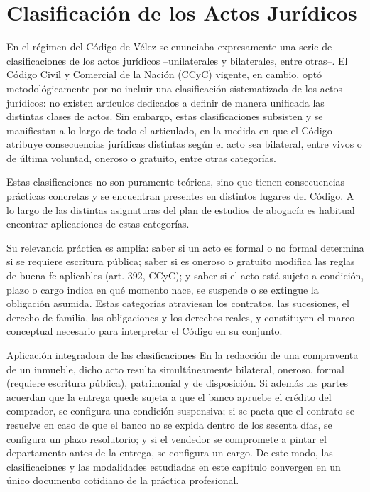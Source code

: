 \documentclass[12pt,oneside]{book}
\begin{document}

\chapter{Clasificación de los Actos Jurídicos}

En el régimen del Código de Vélez se enunciaba expresamente una serie de clasificaciones de los actos jurídicos --unilaterales y bilaterales, entre otras--. El Código Civil y Comercial de la Nación (CCyC) vigente, en cambio, optó metodológicamente por no incluir una clasificación sistematizada de los actos jurídicos: no existen artículos dedicados a definir de manera unificada las distintas clases de actos. Sin embargo, estas clasificaciones subsisten y se manifiestan a lo largo de todo el articulado, en la medida en que el Código atribuye consecuencias jurídicas distintas según el acto sea bilateral, entre vivos o de última voluntad, oneroso o gratuito, entre otras categorías.

\begin{note}
Estas clasificaciones no son puramente teóricas, sino que tienen consecuencias prácticas concretas y se encuentran presentes en distintos lugares del Código. A lo largo de las distintas asignaturas del plan de estudios de abogacía es habitual encontrar aplicaciones de estas categorías.
\end{note}

Su relevancia práctica es amplia: saber si un acto es formal o no formal determina si se requiere escritura pública; saber si es oneroso o gratuito modifica las reglas de buena fe aplicables (art. 392, CCyC); y saber si el acto está sujeto a condición, plazo o cargo indica en qué momento nace, se suspende o se extingue la obligación asumida. Estas categorías atraviesan los contratos, las sucesiones, el derecho de familia, las obligaciones y los derechos reales, y constituyen el marco conceptual necesario para interpretar el Código en su conjunto.

\begin{example}{Aplicación integradora de las clasificaciones}
En la redacción de una compraventa de un inmueble, dicho acto resulta simultáneamente bilateral, oneroso, formal (requiere escritura pública), patrimonial y de disposición. Si además las partes acuerdan que la entrega quede sujeta a que el banco apruebe el crédito del comprador, se configura una condición suspensiva; si se pacta que el contrato se resuelve en caso de que el banco no se expida dentro de los sesenta días, se configura un plazo resolutorio; y si el vendedor se compromete a pintar el departamento antes de la entrega, se configura un cargo. De este modo, las clasificaciones y las modalidades estudiadas en este capítulo convergen en un único documento cotidiano de la práctica profesional.
\end{example}
\end{document}
